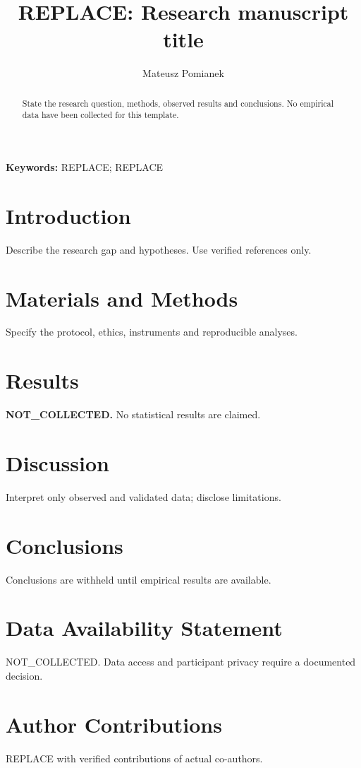 \documentclass[11pt,a4paper]{article}
\title{REPLACE: Research manuscript title}
\author{Mateusz Pomianek}
\date{}
\begin{document}
\maketitle
\begin{abstract}
State the research question, methods, observed results and conclusions.
No empirical data have been collected for this template.
\end{abstract}

\noindent\textbf{Keywords:} REPLACE; REPLACE

\section{Introduction}
Describe the research gap and hypotheses. Use verified references only.

\section{Materials and Methods}
Specify the protocol, ethics, instruments and reproducible analyses.



\section{Results}
\textbf{NOT\_COLLECTED.} No statistical results are claimed.

\section{Discussion}
Interpret only observed and validated data; disclose limitations.

\section{Conclusions}
Conclusions are withheld until empirical results are available.

\section*{Data Availability Statement}
NOT\_COLLECTED. Data access and participant privacy require a documented decision.

\section*{Author Contributions}
REPLACE with verified contributions of actual co-authors.
\end{document}
